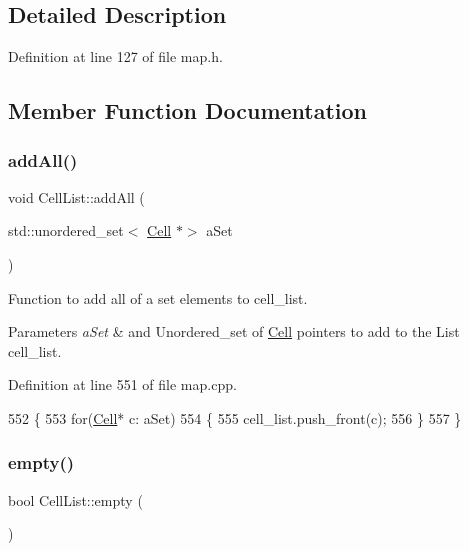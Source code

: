 \subsection{Detailed Description}


Definition at line 127 of file map.\+h.



\subsection{Member Function Documentation}
\hypertarget{class_cell_list_a94857958e9f2156c7b4c76fd774a5fda}{}\label{class_cell_list_a94857958e9f2156c7b4c76fd774a5fda} 
\subsubsection{\texorpdfstring{add\+All()}{addAll()}}
{\footnotesize\ttfamily void Cell\+List\+::add\+All (\begin{DoxyParamCaption}\item[{std\+::unordered\+\_\+set$<$ \hyperlink{class_cell}{Cell} $\ast$$>$}]{a\+Set }\end{DoxyParamCaption})}



Function to add all of a set elements to cell\+\_\+list. 


\begin{DoxyParams}{Parameters}
{\em a\+Set} & and Unordered\+\_\+set of \hyperlink{class_cell}{Cell} pointers to add to the List cell\+\_\+list. \\
\hline
\end{DoxyParams}


Definition at line 551 of file map.\+cpp.


\begin{DoxyCode}
552 \{
553     \textcolor{keywordflow}{for}(\hyperlink{class_cell}{Cell}* c: aSet)
554     \{
555         cell\_list.push\_front(c);
556     \}
557 \}
\end{DoxyCode}
\hypertarget{class_cell_list_a5df3e74d57494b51859a6a223f8b2a30}{}\label{class_cell_list_a5df3e74d57494b51859a6a223f8b2a30} 
\subsubsection{\texorpdfstring{empty()}{empty()}}
{\footnotesize\ttfamily bool Cell\+List\+::empty (\begin{DoxyParamCaption}{ }\end{DoxyParamCaption})}



